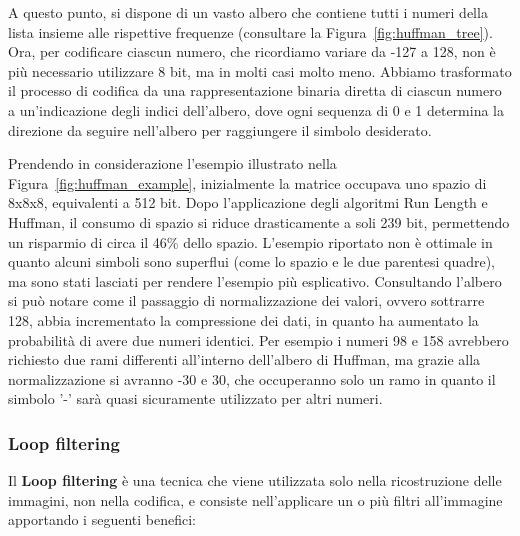 \documentclass[a4paper,12pt, oneside]{article}
\begin{document}
A questo punto, si dispone di un vasto albero che contiene tutti i numeri della lista insieme alle
rispettive frequenze (consultare la Figura~\ref{fig:huffman_tree}). Ora, per codificare ciascun numero,
che ricordiamo variare da -127 a 128, non è più necessario utilizzare 8 bit, ma in molti casi molto
meno. Abbiamo trasformato il processo di codifica da una rappresentazione binaria diretta di ciascun
numero a un'indicazione degli indici dell'albero, dove ogni sequenza di 0 e 1 determina la direzione
da seguire nell'albero per raggiungere il simbolo desiderato.

Prendendo in considerazione l'esempio illustrato nella Figura~\ref{fig:huffman_example}, inizialmente
la matrice occupava uno spazio di 8x8x8, equivalenti a 512 bit. Dopo l'applicazione degli algoritmi
Run Length e Huffman, il consumo di spazio si riduce drasticamente a soli 239 bit, permettendo un
risparmio di circa il 46\% dello spazio. L'esempio riportato non è ottimale in quanto alcuni simboli
sono superflui (come lo spazio e le due parentesi quadre), ma sono stati lasciati per rendere
l'esempio più esplicativo. Consultando l'albero si può notare come il passaggio di normalizzazione
dei valori, ovvero sottrarre 128, abbia incrementato la compressione dei dati, in quanto ha aumentato
la probabilità di avere due numeri identici. Per esempio i numeri 98 e 158 avrebbero richiesto due
rami differenti all'interno dell'albero di Huffman, ma grazie alla normalizzazione si avranno -30 e
30, che occuperanno solo un ramo in quanto il simbolo '-' sarà quasi sicuramente utilizzato per altri
numeri.

\subsubsection{Loop filtering}
Il \textbf{Loop filtering} è una tecnica che viene utilizzata solo nella ricostruzione delle immagini,
non nella codifica, e consiste nell'applicare un o più filtri all'immagine apportando i seguenti benefici:
\end{document}
